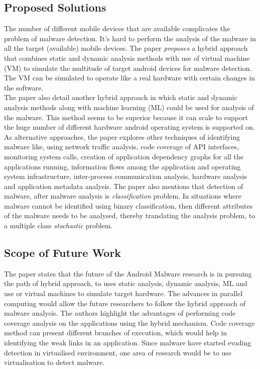 \documentclass[12pt]{article}
\begin{document}
\subsection{Proposed Solutions}\label{ref:paper_sol}
The number of different mobile devices that are available complicates the problem of malware detection. It's hard to perform the analysis of the malware in all the target (available) mobile devices. The paper \textit{proposes} a hybrid approach that combines static and dynamic analysis methods with use of virtual machine (VM) to simulate the multitude of target android devices for malware detection. The VM can be simulated to operate like a real hardware with certain changes in the software. \\
The paper also detail another hybrid approach in which static and dynamic analysis methods along with machine learning (ML) could be used for analysis of the malware. This method seems to be superior because it can scale to support the huge number of different hardware  android operating system is supported on. \\ 
As alternative approaches, the paper explores other techniques of identifying malware like, using network traffic analysis, code coverage of API interfaces, monitoring system calls, creation of application dependency graphs for all the applications running, information flows among the application and operating system infrastructure, inter-process communication analysis, hardware analysis and application metadata analysis. The paper also mentions that detection of  malware, after malware analysis is \textit{classification} problem. In situations where malware cannot be identified using binary classification, then different attributes of the malware needs to be analysed, thereby translating the analysis problem, to a multiple class \textit{stochastic} problem. \\ 

\subsection{Scope of Future Work}\label{ref:paper_scope}
The paper states that the future of the Android Malware research is in pursuing the path of hybrid approach, to uses static analysis, dynamic analysis, ML and use or virtual machines to simulate target hardware. The advances in parallel computing would allow the future researchers to follow the hybrid approach of malware analysis. The authors highlight the advantages of performing code coverage analysis on the applications using the hybrid mechanism. Code coverage method can present different branches of execution, which would help in identifying the weak links in an application. Since malware have started evading detection in virtualised environment, one area of research would be to use virtualisation to detect malware.
\end{document}
